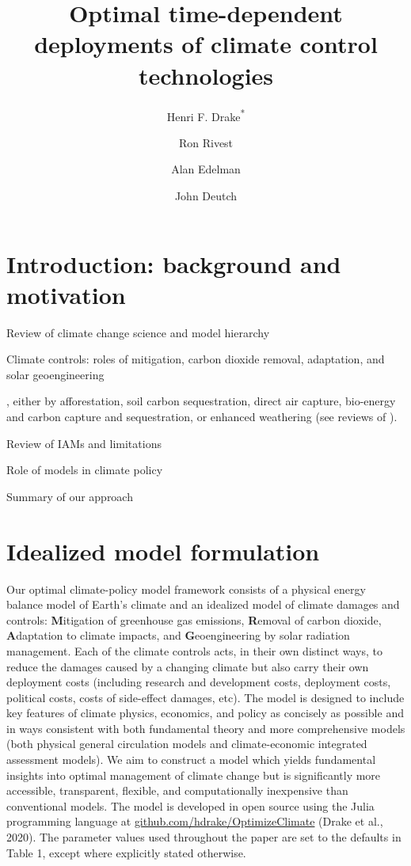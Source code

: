 \documentclass{article}
\title{Optimal time-dependent deployments of climate control technologies}
\author[1,2]{Henri F. Drake\textsuperscript{*}}
\author[1]{Ron Rivest}
\author[1]{Alan Edelman}
\author[1]{John Deutch}
\affil[1]{Massachusetts Institute of Technology, Cambridge, MA, USA}
\affil[2]{Woods Hole Oceanographic Institution, Woods Hole, MA, USA}
\date{}             %
\begin{document}
\maketitle

\section{Introduction: background and motivation}

Review of climate change science and model hierarchy

Climate controls: roles of mitigation, carbon dioxide removal, adaptation, and solar geoengineering

, either by afforestation, soil carbon sequestration, direct air capture, bio-energy and carbon capture and sequestration, or enhanced weathering (see reviews of \citealt{minx_negative_2018, fuss_negative_2018}).

Review of IAMs and limitations

Role of models in climate policy

Summary of our approach

\section{Idealized model formulation}

Our optimal climate-policy model framework consists of a physical energy balance model of Earth's climate and an idealized model of climate damages and controls: \textbf{M}itigation of greenhouse gas emissions, \textbf{R}emoval of carbon dioxide, \textbf{A}daptation to climate impacts, and \textbf{G}eoengineering by solar radiation management. Each of the climate controls acts, in their own distinct ways, to reduce the damages caused by a changing climate but also carry their own deployment costs (including research and development costs, deployment costs, political costs, costs of side-effect damages, etc). The model is designed to include key features of climate physics, economics, and policy as concisely as possible and in ways consistent with both fundamental theory and more comprehensive models (both physical general circulation models and climate-economic integrated assessment models). We aim to construct a model which yields fundamental insights into optimal management of climate change but is significantly more accessible, transparent, flexible, and computationally inexpensive than conventional models. The model is developed in open source using the Julia programming language \citep{bezanson_julia:_2017} at \href{github.com/hdrake/OptimizeClimate}{github.com/hdrake/OptimizeClimate} (Drake et al., 2020). The parameter values used throughout the paper are set to the defaults in Table 1, except where explicitly stated otherwise.
\end{document}
